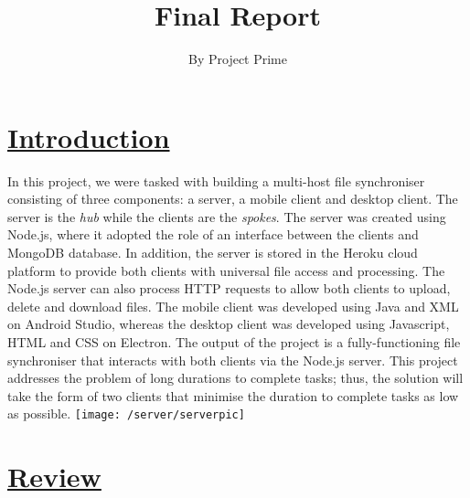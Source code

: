 \documentclass{article}
\title{Final Report}
\author{By Project Prime}
\begin{document}
 \maketitle
 \section{\underline{Introduction}}
In this project, we were tasked with building a multi-host file synchroniser consisting of three components: a server, a mobile client and desktop client. The server is the \textit{hub} while the clients are the \textit{spokes}. The server was created using Node.js, where it adopted the role of an interface between the clients and MongoDB database. In addition, the server is stored in the Heroku cloud platform to provide both clients with universal file access and processing. The Node.js server can also process HTTP requests to allow both clients to upload, delete and download files. The mobile client was developed using Java and XML on Android Studio, whereas the desktop client was developed using Javascript, HTML and CSS on Electron. The output of the project is a fully-functioning file synchroniser that interacts with both clients via the Node.js server. This project addresses the problem of long durations to complete tasks; thus, the solution will take the form of two clients that minimise the duration to complete tasks as low as possible.
\texttt{[image: /server/serverpic]}

\section{\underline{Review}}
\end{document}
